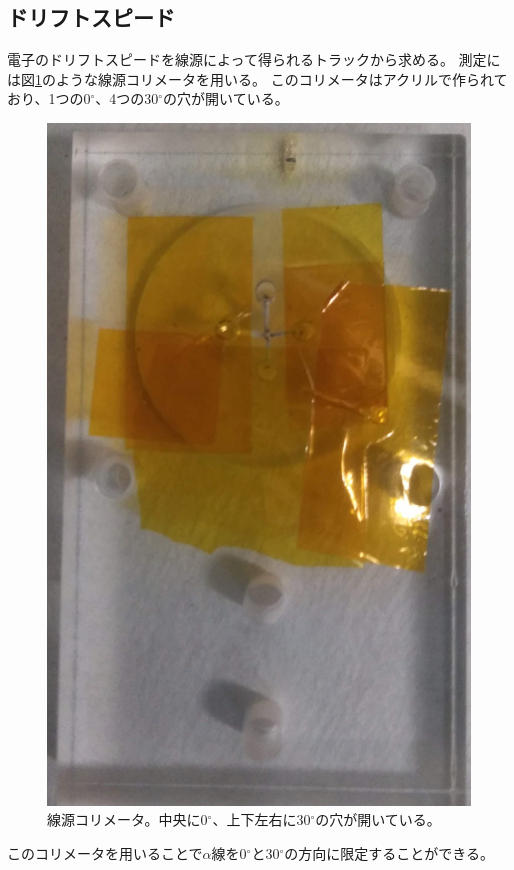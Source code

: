 \documentclass[../master]{subfiles}
\begin{document}
\subsection{ドリフトスピード}
電子のドリフトスピードを線源によって得られるトラックから求める。
測定には図\ref{pic::collimator}のような線源コリメータを用いる。
このコリメータはアクリルで作られており、1つの0${}^{\circ}$、4つの30${}^{\circ}$の穴が開いている。
\begin{figure}
  \centering
  \includegraphics[clip, height=0.7\columnwidth, angle=90]{pic/IMG_20191023_145443_trmd.jpg}
  \caption[線源コリメータ。]
          {線源コリメータ。中央に0${}^{\circ}$、上下左右に30${}^{\circ}$の穴が開いている。}
  \label{pic::collimator}  
\end{figure}
このコリメータを用いることで$\alpha$線を0${}^{\circ}$と30${}^{\circ}$の方向に限定することができる。
\end{document}
